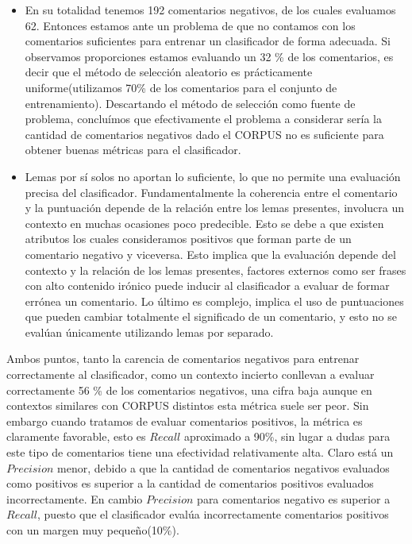 \documentclass[12pt]{article}
\begin{document}
\begin{itemize}
  \item En su totalidad tenemos 192 comentarios negativos, de los cuales evaluamos 62. Entonces estamos ante un problema de que no contamos con los comentarios suficientes para entrenar un clasificador de forma adecuada. Si observamos proporciones estamos evaluando un 32 \% de los comentarios, es decir que el método de selección aleatorio es prácticamente uniforme(utilizamos 70\% de los comentarios para el conjunto de entrenamiento). Descartando el método de selección como fuente de problema, concluímos que efectivamente el problema a considerar sería la cantidad de comentarios negativos dado el CORPUS no es suficiente para obtener buenas métricas para el clasificador.
  \item Lemas por sí solos no aportan lo suficiente, lo que no permite una evaluación precisa del clasificador. Fundamentalmente la coherencia entre el comentario y la puntuación depende de la relación entre los lemas presentes, involucra un contexto en muchas ocasiones poco predecible. Esto se debe a que existen atributos los cuales consideramos positivos que forman parte de un comentario negativo y viceversa. Esto implica que la evaluación depende del contexto y la relación de los lemas presentes, factores externos como ser frases con alto contenido irónico puede inducir al clasificador a evaluar de formar errónea un comentario. Lo último es complejo, implica el uso de puntuaciones que pueden cambiar totalmente el significado de un comentario, y esto no se evalúan únicamente utilizando lemas por separado.
\end{itemize}
Ambos puntos, tanto la carencia de comentarios negativos para entrenar correctamente al clasificador, como un contexto incierto conllevan a evaluar correctamente 56 \% de los comentarios negativos, una cifra baja aunque en contextos similares con CORPUS distintos esta métrica suele ser peor.
Sin embargo cuando tratamos de evaluar comentarios positivos, la métrica es claramente favorable, esto es $Recall$ aproximado a 90\%, sin lugar a dudas para este tipo de comentarios tiene una efectividad relativamente alta. Claro está un $Precision$ menor, debido a que la cantidad de comentarios negativos evaluados como positivos es superior a la cantidad de comentarios positivos evaluados incorrectamente. En cambio $Precision$ para comentarios negativo es superior a $Recall$, puesto que el clasificador evalúa incorrectamente comentarios positivos con un margen muy pequeño(10\%).
\end{document}
